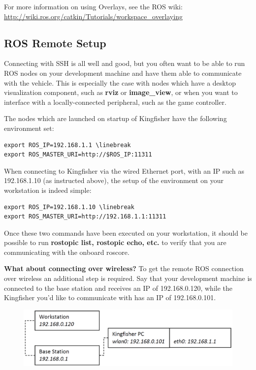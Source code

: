 \documentclass[]{clearpath-latex/clearpath-manual}
\begin{document}
\begin{enumerate}[nolistsep]
\begin{enumerate}[nolistsep]
For more information on using Overlays, see the ROS wiki: \url{http://wiki.ros.org/catkin/Tutorials/workspace_overlaying}

\subsection{ROS Remote Setup}
Connecting with SSH is all well and good, but you often want to be able to run ROS nodes on your development machine and have them able to communicate with the vehicle. This is especially the case with nodes which have a desktop visualization component, such as \textbf{rviz} or \textbf{image_view}, or when you want to interface with a locally-connected peripheral, such as the game controller.

The nodes which are launched on startup of Kingfisher have the following environment set:

\begin{lstlisting}
export ROS_IP=192.168.1.1 \linebreak
export ROS_MASTER_URI=http://$ROS_IP:11311
\end{lstlisting}

When connecting to Kingfisher via the wired Ethernet port, with an IP such as 192.168.1.10 (as instructed above), the setup of the environment on your workstation is indeed simple:

\begin{lstlisting}
export ROS_IP=192.168.1.10 \linebreak
export ROS_MASTER_URI=http://192.168.1.1:11311
\end{lstlisting}

Once these two commands have been executed on your workstation, it should be possible to run \textbf{rostopic list, rostopic echo, etc.} to verify that you are communicating with the onboard roscore.

\textbf{What about connecting over wireless?} To get the remote ROS connection over wireless an additional step is required. Say that your development machine is connected to the base station and receives an IP of 192.168.0.120, while the Kingfisher you’d like to communicate with has an IP of 192.168.0.101.

\begin{figure}[h]
  \centering
  \includegraphics[width=0.75\linewidth]{kf_wireless.PNG}
  \label{kf_wireless}
\end{figure}


\end{enumerate}
\end{enumerate}
\end{document}
